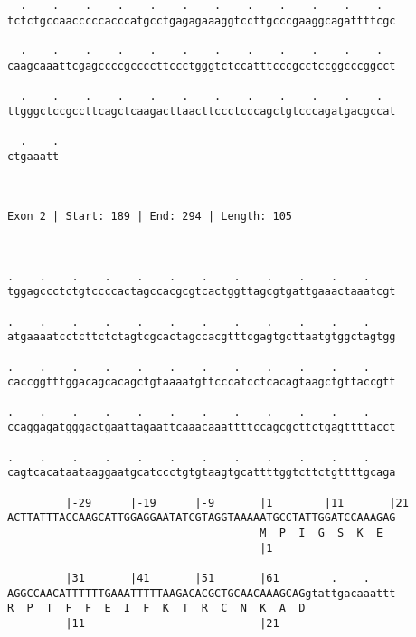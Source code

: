 \documentclass{article}
\begin{document}
\begin{Verbatim}
  .    .    .    .    .    .    .    .    .    .    .    .  
tctctgccaacccccacccatgcctgagagaaaggtccttgcccgaaggcagattttcgc
                                                            
  .    .    .    .    .    .    .    .    .    .    .    .  
caagcaaattcgagccccgccccttccctgggtctccatttcccgcctccggcccggcct
                                                            
  .    .    .    .    .    .    .    .    .    .    .    .  
ttgggctccgccttcagctcaagacttaacttccctcccagctgtcccagatgacgccat
                                                            
  .    .
ctgaaatt
        
        
 
Exon 2 | Start: 189 | End: 294 | Length: 105



.    .    .    .    .    .    .    .    .    .    .    .    
tggagccctctgtccccactagccacgcgtcactggttagcgtgattgaaactaaatcgt
                                                            
.    .    .    .    .    .    .    .    .    .    .    .    
atgaaaatcctcttctctagtcgcactagccacgtttcgagtgcttaatgtggctagtgg
                                                            
.    .    .    .    .    .    .    .    .    .    .    .    
caccggtttggacagcacagctgtaaaatgttcccatcctcacagtaagctgttaccgtt
                                                            
.    .    .    .    .    .    .    .    .    .    .    .    
ccaggagatgggactgaattagaattcaaacaaattttccagcgcttctgagttttacct
                                                            
.    .    .    .    .    .    .    .    .    .    .    .    
cagtcacataataaggaatgcatccctgtgtaagtgcattttggtcttctgttttgcaga
                                                            
         |-29      |-19      |-9       |1        |11       |21
ACTTATTTACCAAGCATTGGAGGAATATCGTAGGTAAAAATGCCTATTGGATCCAAAGAG
                                       M  P  I  G  S  K  E  
                                       |1                   
  
         |31       |41       |51       |61        .    .    
AGGCCAACATTTTTTGAAATTTTTAAGACACGCTGCAACAAAGCAGgtattgacaaattt
R  P  T  F  F  E  I  F  K  T  R  C  N  K  A  D              
         |11                           |21                  
  

\end{Verbatim}
\end{document}
